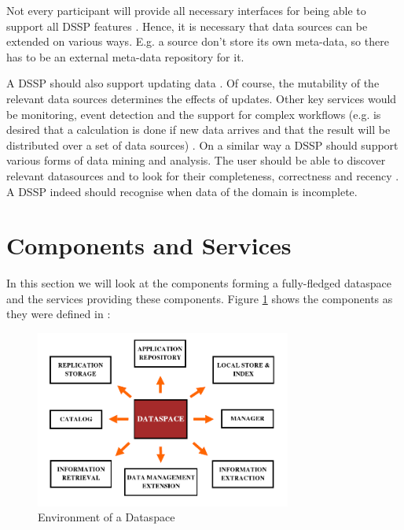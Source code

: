 Not every participant will provide all necessary interfaces for being able to support all DSSP features \cite[p. 29]{Franklin:2005:DDN:1107499.1107502}. 
Hence, it is necessary that data sources can be extended on various ways. E.g. a source don't store its own meta-data, so there has to be an external meta-data repository for it. 

A DSSP should also support updating data \cite[p. 29]{Franklin:2005:DDN:1107499.1107502}. Of course, the mutability of the relevant data sources determines the effects of updates.  
Other key services would be monitoring, event detection and the support for complex workflows (e.g. is desired that a calculation is done if new data arrives and that the result will be distributed over a set of data sources) \cite[p. 29]{Franklin:2005:DDN:1107499.1107502}. On a similar way a DSSP should support various forms of data mining and analysis. 
The user should be able to discover relevant datasources and to look for their completeness, correctness and recency \cite[p. 29]{Franklin:2005:DDN:1107499.1107502}. A DSSP indeed should recognise when data of the domain is incomplete. 

\section{Components and Services}

In this section we will look at the components forming a fully-fledged dataspace and the services providing these components. Figure \ref{TowardsRealizationOfDataspacesEnvironment} shows the components as they were defined in \cite{1698348}:


\begin{figure}[H]
	\begin{center}
		\includegraphics[width=0.75\textwidth]{figures/TowardsRealizationOfDataspaces1.png}
	\end{center}
	\caption{Environment of  a Dataspace \cite[p. 2]{1698348}}
	\label{TowardsRealizationOfDataspacesEnvironment}
\end{figure}

